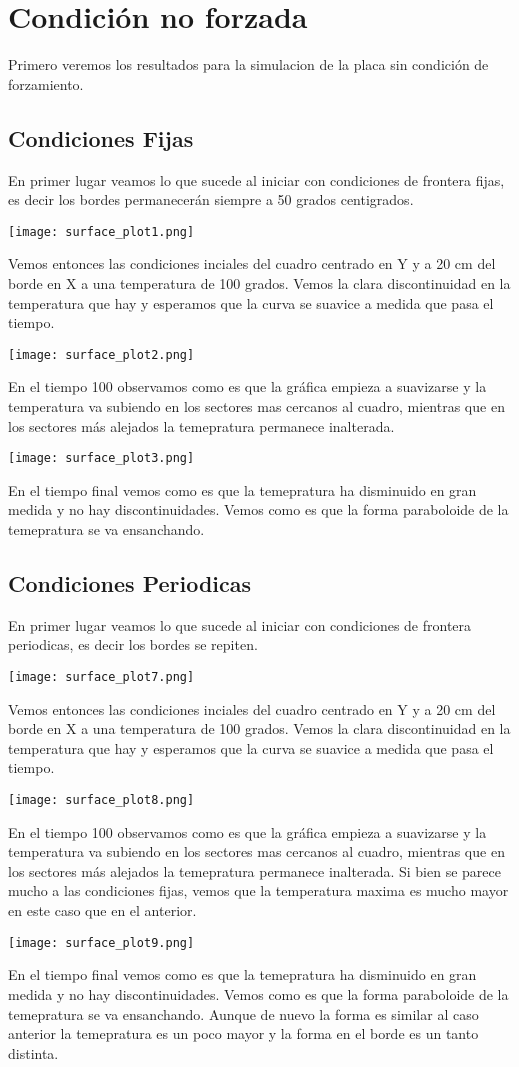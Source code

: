\documentclass{article}
\begin{document}
\section{Condici\'on no forzada}
Primero veremos los resultados para la simulacion de la placa sin condici\'on de forzamiento. 
\subsection{Condiciones Fijas}
En primer lugar veamos lo que sucede al iniciar con condiciones de frontera fijas, es decir los bordes permanecer\'an siempre a 50 grados centigrados.\\
\centerline{\texttt{[image: surface\_plot1.png]}}
Vemos entonces las condiciones inciales del cuadro centrado en Y y a 20 cm del borde en X a una temperatura de 100 grados. Vemos la clara discontinuidad en la temperatura que hay y esperamos que la curva se suavice a medida que pasa el tiempo.\\
\centerline{\texttt{[image: surface\_plot2.png]}}
En el tiempo 100 observamos como es que la gr\'afica empieza a suavizarse y la temperatura va subiendo en los sectores mas cercanos al cuadro, mientras que en los sectores m\'as alejados la temepratura permanece inalterada. \\
\centerline{\texttt{[image: surface\_plot3.png]}}
En el tiempo final vemos como es que la temepratura ha disminuido en gran medida y no hay discontinuidades. Vemos como es que la forma paraboloide de la temepratura se va ensanchando.\\  
\subsection{Condiciones Periodicas}
En primer lugar veamos lo que sucede al iniciar con condiciones de frontera periodicas, es decir los bordes se repiten.\\
\centerline{\texttt{[image: surface\_plot7.png]}}
Vemos entonces las condiciones inciales del cuadro centrado en Y y a 20 cm del borde en X a una temperatura de 100 grados. Vemos la clara discontinuidad en la temperatura que hay y esperamos que la curva se suavice a medida que pasa el tiempo.\\
\centerline{\texttt{[image: surface\_plot8.png]}}
En el tiempo 100 observamos como es que la gr\'afica empieza a suavizarse y la temperatura va subiendo en los sectores mas cercanos al cuadro, mientras que en los sectores m\'as alejados la temepratura permanece inalterada. Si bien se parece mucho a las condiciones fijas, vemos que la temperatura maxima es mucho mayor en este caso que en el anterior.\\
\centerline{\texttt{[image: surface\_plot9.png]}}
En el tiempo final vemos como es que la temepratura ha disminuido en gran medida y no hay discontinuidades. Vemos como es que la forma paraboloide de la temepratura se va ensanchando. Aunque de nuevo la forma es similar al caso anterior la temepratura es un poco mayor y la forma en el borde es un tanto distinta.\\  
\end{document}
